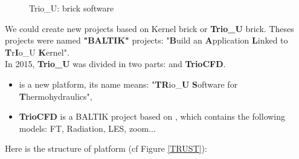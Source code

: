 \begin{figure}[h!]
\begin{center}
\caption{Trio\_U: brick software}
\label{TrioU}
\end{center}
\end{figure}

We could create new projects based on Kernel brick or \textbf{Trio\_U} brick. 
Theses projects were named \textbf{"BALTIK"} projects: "\textbf{B}uild an \textbf{A}pplication \textbf{L}inked to \textbf{T}r\textbf{I}o\_U \textbf{K}ernel".\\

In 2015, \textbf{Trio\_U} was divided in two parts: \trust and \textbf{TrioCFD}.
\begin{itemize}
\item \trust is a new platform, its name means: "\textbf{TR}io\_\textbf{U} \textbf{S}oftware for \textbf{T}hermohydraulics",
\item \textbf{TrioCFD} is a BALTIK project based on \trust, which contains the following models: FT, Radiation, LES, zoom...
\end{itemize}

Here is the structure of \trust platform (cf Figure \ref{TRUST}):

